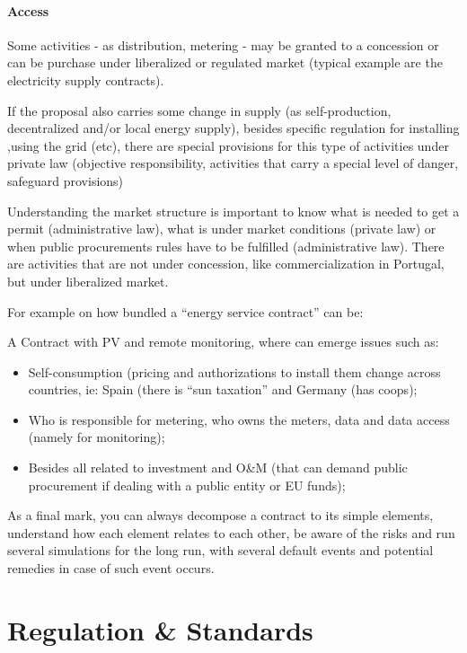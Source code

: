 \documentclass[]{book}
\theoremstyle{definition}
\theoremstyle{definition}
\theoremstyle{definition}
\theoremstyle{remark}
\begin{document}
\subsubsection{Access}\label{access}

Some activities - as distribution, metering - may be granted to a
concession or can be purchase under liberalized or regulated market
(typical example are the electricity supply contracts).

If the proposal also carries some change in supply (as self-production,
decentralized and/or local energy supply), besides specific regulation
for installing ,using the grid (etc), there are special provisions for
this type of activities under private law (objective responsibility,
activities that carry a special level of danger, safeguard provisions)

Understanding the market structure is important to know what is needed
to get a permit (administrative law), what is under market conditions
(private law) or when public procurements rules have to be fulfilled
(administrative law). There are activities that are not under
concession, like commercialization in Portugal, but under liberalized
market.

For example on how bundled a ``energy service contract'' can be:

A Contract with PV and remote monitoring, where can emerge issues such
as:

\begin{itemize}
\item
  Self-consumption (pricing and authorizations to install them change
  across countries, ie: Spain (there is ``sun taxation'' and Germany
  (has coops);
\item
  Who is responsible for metering, who owns the meters, data and data
  access (namely for monitoring);
\item
  Besides all related to investment and O\&M (that can demand public
  procurement if dealing with a public entity or EU funds);
\end{itemize}

As a final mark, you can always decompose a contract to its simple
elements, understand how each element relates to each other, be aware of
the risks and run several simulations for the long run, with several
default events and potential remedies in case of such event occurs.

\chapter{Regulation \& Standards}\label{regulation-standards}
\end{document}
